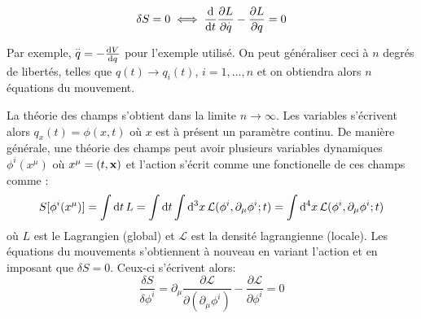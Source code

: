 \begin{equation}
    \delta S = 0 \iff \frac{\mathrm{d} }{\mathrm{d} t}\frac{\partial L}{\partial \overset{.}{q}} - \frac{\partial L}{\partial q} = 0
\end{equation}

Par exemple, $\overset{..}{q} = -\frac{\mathrm{d} V}{\mathrm{d} q}$ pour l'exemple utilisé. On peut généraliser ceci à $n$ degrés de libertés, telles que $q(t) \to q_{i}(t)$, $i = 1, ..., n$ et on obtiendra alors $n$ équations du mouvement.

La théorie des champs s'obtient dans la limite $n \to \infty$. Les variables s'écrivent alors $q_x(t) = \phi (x, t) $ où $x$ est à présent un paramètre continu. De manière générale, une théorie des champs peut avoir plusieurs variables dynamiques $\phi^{i}(x^{\mu})$ où $x^{\mu} = (t, \bm{\mathrm{x}})$ et l'action s'écrit comme une fonctionelle de ces champs comme :
\begin{align}
    S[\phi^i(x^\mu)] = \int \mathrm{d} t\, L = \int \mathrm{d} t \int \mathrm{d} ^3x \,\mathcal{L}(\phi^{i}, \partial_{\mu} \phi^{i};t) = \int \mathrm{d} ^4x \,\mathcal{L}(\phi^{i}, \partial_{\mu} \phi^{i};t)
\end{align}
où $L$ est le Lagrangien (global) et $\mathcal{L}$ est la densité lagrangienne (locale). Les équations du mouvements s'obtiennent à nouveau en variant l'action et en imposant que $\delta S = 0$. Ceux-ci s'écrivent alors:
\begin{equation}
    \label{eq:Euler-Lagrange functional}
   \boxed{\frac{\delta S}{\delta \phi^i} = \partial_{\mu}\frac{\partial \mathcal{L}}{\partial (\partial_{\mu}\phi^{i})} - \frac{\partial \mathcal{L}}{\partial \phi^{i}} = 0}
\end{equation}

